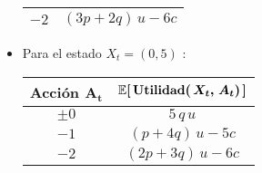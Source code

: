 \documentclass[ a4paper, twoside, 11pt]{article}
\begin{document}
\begin{problem}
\begin{itemize}
\begin{table}[H]
\begin{tabular}{|c|c|}
$-2$ & $( 3p + 2q ) \, u - 6c$ \\ \hline
\end{tabular}
\end{table}
\item Para el estado $X_t = (0,5)$ :
\begin{table}[H]
\centering
\begin{tabular}{|c|c|}
\hline
\textbf{Acci\'on} $\boldsymbol{A_t}$
& $\boldsymbol{ \mathbb{E}[ \, \textbf{Utilidad}( \, X_t, \, A_t ) \, ]}$ \\ \hline
$\pm 0$ & $5 \, q \, u$ \\ \hline
$-1$ & $( p + 4q ) \, u - 5c$ \\ \hline
$-2$ & $( 2p + 3q ) \, u - 6c$ \\ \hline
\end{tabular}
\end{table}

\end{itemize}

\end{problem}
\fullskip
\end{document}
